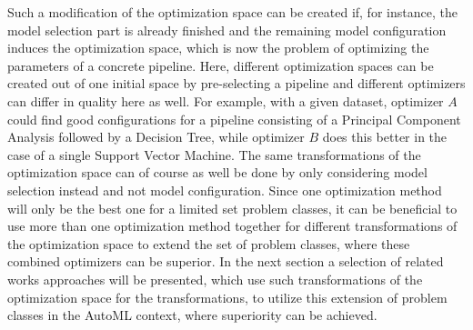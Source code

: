Such a modification of the optimization space can be created if, for instance, the model selection part is already finished and the remaining model configuration induces the optimization space, which is now the problem of optimizing the parameters of a concrete pipeline.
Here, different optimization spaces can be created out of one initial space by pre-selecting a pipeline and different optimizers can differ in quality here as well.
For example, with a given dataset, optimizer $A$ could find good configurations for a pipeline consisting of a Principal Component Analysis followed by a Decision Tree, while optimizer $B$ does this better in the case of a single Support Vector Machine.
The same transformations of the optimization space can of course as well be done by only considering model selection instead and not model configuration.\newline
Since one optimization method will only be the best one for a limited set problem classes, it can be beneficial to use more than one optimization method together for different transformations of the optimization space to extend the set of problem classes, where these combined optimizers can be superior.\newline
In the next section a selection of related works approaches will be presented, which use such transformations of the optimization space for the transformations, to utilize this extension of problem classes in the AutoML context, where superiority can be achieved.

